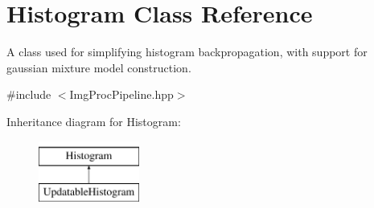 \hypertarget{classHistogram}{\section{\-Histogram \-Class \-Reference}
\label{classHistogram}
}


\-A class used for simplifying histogram backpropagation, with support for gaussian mixture model construction.  




{\ttfamily \#include $<$\-Img\-Proc\-Pipeline.\-hpp$>$}

\-Inheritance diagram for \-Histogram\-:\begin{figure}[H]
\begin{center}
\leavevmode
\includegraphics[height=2.000000cm]{classHistogram}
\end{center}
\end{figure}
